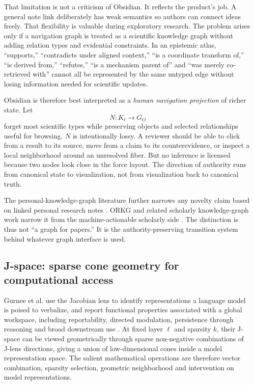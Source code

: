 That limitation is not a criticism of Obsidian. It reflects the product's job. A general note link deliberately has weak semantics so authors can connect ideas freely. That flexibility is valuable during exploratory research. The problem arises only if a navigation graph is treated as a scientific knowledge graph without adding relation types and evidential constraints. In an epistemic atlas, ``supports,'' ``contradicts under aligned context,'' ``is a coordinate transform of,'' ``is derived from,'' ``refutes,'' ``is a mechanism parent of'' and ``was merely co-retrieved with'' cannot all be represented by the same untyped edge without losing information needed for scientific updates.

Obsidian is therefore best interpreted as a \emph{human navigation projection} of richer state. Let
\[
N:K_t\rightarrow G_O
\]
forget most scientific types while preserving objects and selected relationships useful for browsing. \(N\) is intentionally lossy. A reviewer should be able to click from a result to its source, move from a claim to its counterevidence, or inspect a local neighborhood around an unresolved fiber. But no inference is licensed because two nodes look close in the force layout. The direction of authority runs from canonical state to visualization, not from visualization back to canonical truth.

The personal-knowledge-graph literature further narrows any novelty claim based on linked personal research notes \cite{skjaeveland2023}. ORKG and related scholarly knowledge-graph work narrow it from the machine-actionable scholarly side \cite{jaradeh2019orkg}. The \RAKL{} distinction is thus not ``a graph for papers.'' It is the authority-preserving transition system behind whatever graph interface is used.

\subsection{J-space: sparse cone geometry for computational access}

Gurnee et al. use the Jacobian lens to identify representations a language model is poised to verbalize, and report functional properties associated with a global workspace, including reportability, directed modulation, persistence through reasoning and broad downstream use \cite{gurnee2026}. At fixed layer \(\ell\) and sparsity \(k\), their J-space can be viewed geometrically through sparse non-negative combinations of J-lens directions, giving a union of low-dimensional cones inside a model representation space. The salient mathematical operations are therefore vector combination, sparsity selection, geometric neighborhood and intervention on model representations.

